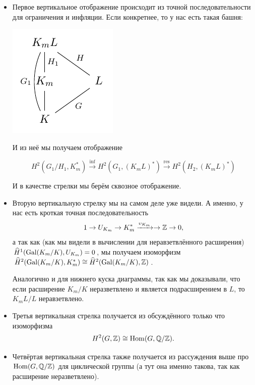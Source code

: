   	\begin{itemize}
  		\item Первое вертикальное отображение происходит из точной последовательности для ограничения и инфляции. Если конкретнее, то у нас есть такая башня: 

  		\begin{center}
  			\includegraphics{lectures/6/pictures/cd_31.pdf}
  		\end{center}

  		И из неё мы получаем отображение 

  		\[
  			  H^2(G_1/H_1, K_m^*) \xrightarrow{\inf} H^2(G_1, (K_m L)^*) \xrightarrow{\mathrm{res}} H^2(H_2, (K_m L)^*)
  		\]

  		И в качестве стрелки мы берём сквозное отображение.

  		\item Вторую вертикальную стрелку мы на самом деле уже видели. А именно, у нас есть кроткая точная последовательность  
  		\[
  			1 \to U_{K_m} \to K_m^* \xrightarrow{\upsilon_{K_m}} \to \mathbb{Z} \to 0,
  		\]
  		а так как (как мы видели в вычислении для неравзетвлённого расширения) $\widehat{H}^{1}(\operatorname{Gal}(K_m/K), U_{K_m}) = 0$, мы получаем изоморфизм $\widehat{H}^2(\operatorname{Gal}(K_m/K), K_m^*) \cong \widehat{H}^2(\operatorname{Gal}(K_m/K), \mathbb{Z})$.

  		Аналогично и для нижнего куска диаграммы, так как мы доказывали, что если расширение $K_m/K$ неразветвлено и является подрасширением в $L$, то $K_m L / L$ неравзетвлено. 

  		\item Третья вертикальная стрелка получается из обсуждённого только что изоморфизма 
  		\[
  			H^2(G, \mathbb{Z}) \cong \operatorname{Hom}(G, \mathbb{Q}/\mathbb{Z}).
  		\]

  		\item Четвёртая вертикальная стрелка также получается из рассуждения выше про $\operatorname{Hom}(G, \mathbb{Q}/\mathbb{Z})$ для циклической группы (а тут она именно такова, так как расширение неразветвлено). 
  	\end{itemize}

